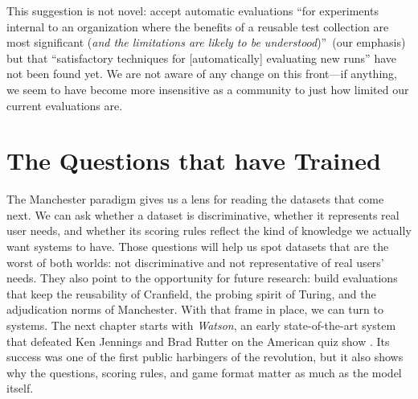 This suggestion is not novel: \citet{voorhees-00} accept automatic
evaluations ``for experiments internal to an organization where the
benefits of a reusable test collection are most significant (\emph{and
  the limitations are likely to be understood})''~(our emphasis) but
that ``satisfactory techniques for [automatically] evaluating new
runs'' have not been found yet.  We are not aware of any change on
this front---if anything, we seem to have become more insensitive as a
community to just how limited our current evaluations are.

\section{The Questions that have Trained }
\label{sec:manchester:forwardpoint}

The Manchester paradigm gives us a lens for reading the  datasets that
come next. We can ask whether a dataset is discriminative, whether it represents
real user needs, and whether its scoring rules reflect the kind of knowledge we
actually want systems to have.
%
Those questions will help us spot datasets that are the worst of both worlds:
not discriminative and not representative of real users' needs. They also point
to the opportunity for future research: build evaluations that keep the
reusability of Cranfield, the probing spirit of Turing, and the adjudication
norms of Manchester.
%
With that frame in place, we can turn to systems.
%
The next chapter starts with \textit{Watson}, an early
state-of-the-art system that defeated Ken Jennings and Brad Rutter on
the American quiz show \jeopardy{}.
%
Its success was one of the first public harbingers of the 
revolution, but it also shows why the
questions, scoring rules, and game format matter as much as the model itself.

